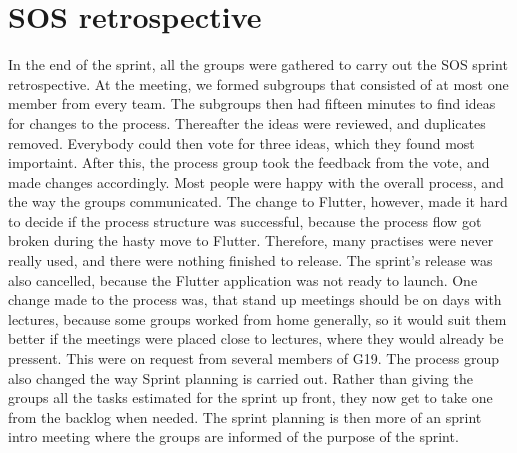 \section{SOS retrospective}
In the end of the sprint, all the groups were gathered to carry out the SOS sprint retrospective. At the meeting, we formed subgroups that consisted of at most one member from every team. 
The subgroups then had fifteen minutes to find ideas for changes to the process. Thereafter the ideas were reviewed, and duplicates removed. Everybody could then vote for three ideas, which they found most importaint. 
After this, the process group took the feedback from the vote, and made changes accordingly. Most people were happy with the overall process, and the way the groups communicated. 
The change to Flutter, however, made it hard to decide if the process structure was successful, because the process flow got broken during the hasty move to Flutter. Therefore, many practises were never really used, and there were nothing finished to release.
The sprint's release was also cancelled, because the Flutter application was not ready to launch. One change made to the process was, that stand up meetings should be on days with lectures, because some groups worked from home generally, so it would suit them better if the meetings were placed close to lectures, where they would already be pressent.
This were on request from several members of G19. The process group also changed the way Sprint planning is carried out.
Rather than giving the groups all the tasks estimated for the sprint up front, they now get to take one from the backlog when needed. 
The sprint planning is then more of an sprint intro meeting where the groups are informed of the purpose of the sprint. 
